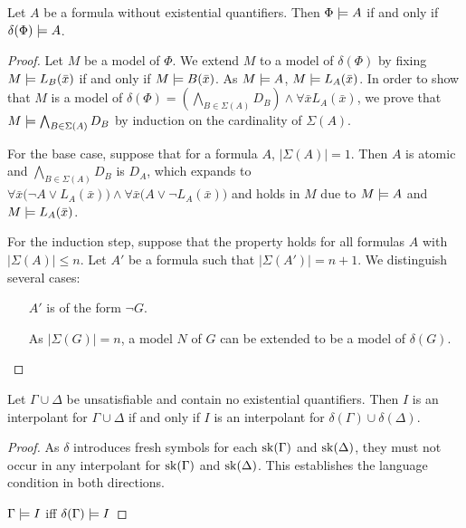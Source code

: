 \begin{lemma}
	\label{prop:definitional_form}
	Let $A$ be a formula without existential quantifiers.
	Then $\Phi \models A$ if and only if $\delta(\Phi) \models A$.
\end{lemma}
\begin{proof}
	Let $M$ be a model of $\Phi$. 
	We extend $M$ to a model of $\delta(\Phi)$ by fixing $M \models L_B(\bar x)$ if and only if $M \models B(\bar x)$.
	As $M \models A$, $M\models L_A(\bar x)$. 
	In order to show that $M$ is a model of $\delta(\Phi) = \left(\bigwedge_{B \in \Sigma(A)} D_B\right) \land \forall \bar x L_A(\bar x)$, we prove that $M \models \bigwedge_{B \in \Sigma(A)} D_B$ by induction on the cardinality of $\Sigma(A)$.

	For the base case, suppose that for a formula $A$, $\vert \Sigma(A) \vert = 1$.
	Then $A$ is atomic and $\bigwedge_{B \in \Sigma(A)} D_B $ is $ D_A $, which expands to $ \forall \bar x \big(\lnot A \lor L_A(\bar x)\big) \land \forall \bar x \big(A \lor \lnot L_A(\bar x)\big)$ and holds in $M$ due to $M \models A$ and $M \models L_A(\bar x)$.

	\newcommand{\cardinalitysigma}[1]{\ensuremath{\vert \Sigma(#1) \vert}}

	For the induction step, suppose that the property holds for all formulas $A$ with $\vert \Sigma(A) \vert \leq n$.
	Let $A'$ be a formula such that $\vert \Sigma(A') \vert = n+1$.
	We distinguish several cases:

	\begin{itemize}
		\item[$A'$ is of the form $\lnot G$.]

			As $\cardinalitysigma{G} = n$, a model $N$ of $G$ can be extended to be a model of $\delta(G)$.


	\end{itemize}




\end{proof}

\begin{prop}
	Let $\Gamma \cup \Delta$ be unsatisfiable and contain no existential quantifiers.
	Then $I$ is an interpolant for \mbox{$\Gamma \cup \Delta$} if and only if 
	$I$ is an interpolant for $\delta(\Gamma) \cup \delta(\Delta)$.
\end{prop}
\begin{proof}
	As $\delta$ introduces fresh symbols for each $\operatorname{sk}(\Gamma)$ and $\operatorname{sk}(\Delta)$, they must not occur in any interpolant for $\operatorname{sk}(\Gamma)$ and $\operatorname{sk}(\Delta)$. 
	This establishes the language condition in both directions.

	$\Gamma \models I$ iff $\delta(\Gamma) \models I$

\end{proof}

